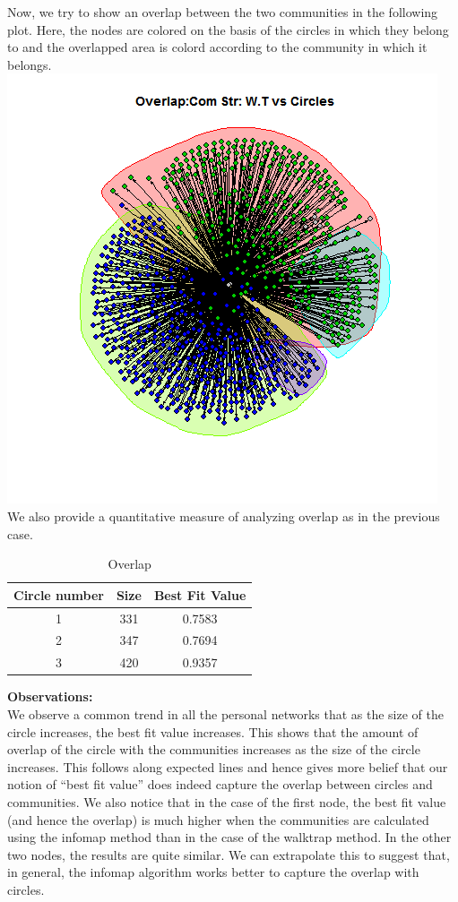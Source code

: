 \documentclass{article}
\begin{document}
\begin{enumerate}
 Now, we try to show an overlap between the two communities in the following plot.
Here, the nodes are colored on the basis of the circles in which they belong to and 
the overlapped area is colord according to the community in which it belongs.\\
 \includegraphics[scale=0.7]{7h} \\
 
 We also provide a quantitative measure of analyzing overlap as in the previous case.
\begin{table}[ht]
\caption{Overlap}
\centering
\begin{tabular}{|c |c |c |}
\hline\hline
\newline

Circle number & Size & Best Fit Value \\ [0.5ex]
\hline

1 & 331 & 0.7583 \\
\hline
2 & 347 & 0.7694 \\
\hline
3 & 420 & 0.9357 \\
\hline
\end{tabular}
\end{table} 
\end{enumerate}

\textbf{Observations:}\\
We observe a common trend in all the personal networks that as the size of the circle increases, the best fit value increases.
This shows that the amount of overlap of the circle with the communities increases as the size of the circle increases.
This follows along expected lines and hence gives more belief that our notion of 
``best fit value'' does indeed capture the overlap between circles and communities.
We also notice that in the case of the first node, the best fit value (and hence the overlap) is much higher when the communities
are calculated using the infomap method than in the case of the walktrap method. In the other two nodes, the results are quite similar.
We can extrapolate this to suggest that, in general, the infomap algorithm works better to capture the overlap with circles.
\end{document}
